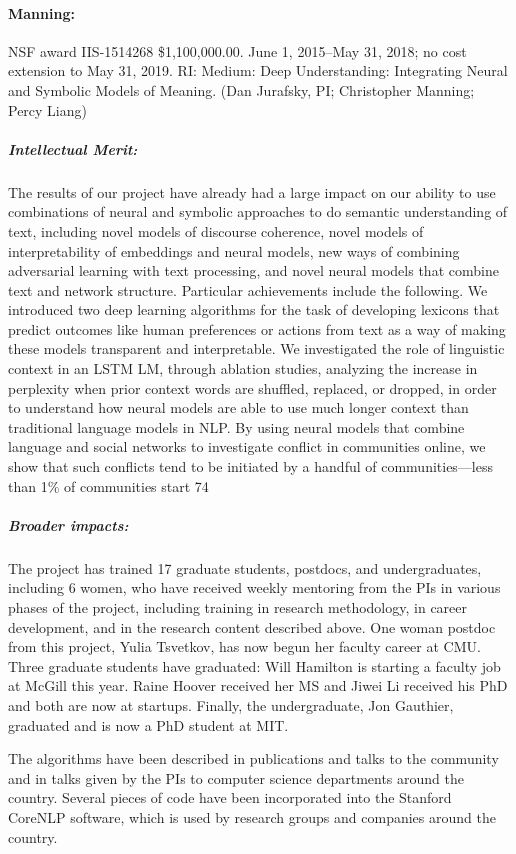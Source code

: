 \documentclass{article}
\begin{document}
\paragraph{Manning:} NSF award IIS-1514268 \$1,100,000.00. June 1, 2015--May 31, 2018; no cost extension to May 31, 2019. RI: Medium: Deep Understanding: Integrating Neural and Symbolic Models of Meaning. (Dan Jurafsky, PI; Christopher Manning; Percy Liang)

\subparagraph{Intellectual Merit:} The results of our project have already had a large impact on our ability to use combinations of neural and symbolic approaches to do semantic understanding of text, including novel models of discourse coherence, novel models of interpretability of embeddings and neural models, new ways of combining adversarial learning with text processing, and novel neural models that combine text and network structure. Particular achievements include the following. We introduced two deep learning algorithms for the task of developing lexicons that predict outcomes like human preferences or actions from text as a way of making these models transparent and interpretable. We investigated the role of linguistic context in an LSTM LM, through ablation studies, analyzing the increase in perplexity when prior context words are shuffled, replaced, or dropped, in order to understand how neural models are able to use much longer context than traditional language models in NLP. By using neural models that combine language and social networks to investigate conflict in communities online, we show that such conflicts tend to be initiated by a handful of communities—less than 1\% of communities start 74%

\subparagraph{Broader impacts:} 

The project has trained 17 graduate students, postdocs, and undergraduates, including 6 women, who have received weekly mentoring from the PIs in various phases of the project, including training in research methodology, in career development, and in the research content described above. One woman postdoc from this project, Yulia Tsvetkov, has now begun her faculty career at CMU. Three graduate students have graduated: Will Hamilton is starting a faculty job at McGill this year. Raine Hoover received her MS and Jiwei Li received his PhD and both are now at startups. Finally, the undergraduate, Jon Gauthier, graduated and is now a PhD student at MIT.

The algorithms have been described in publications and talks to the community and in talks given by the PIs to computer science departments around the country. Several pieces of code have been incorporated into the Stanford CoreNLP software, which is used by research groups and companies around the country.
\end{document}

